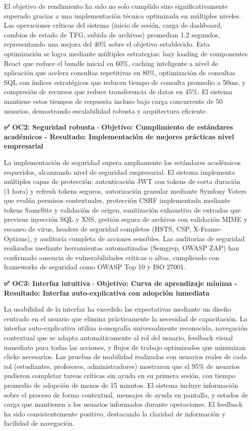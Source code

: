 \documentclass[12pt,a4paper,oneside]{report}
\begin{document}
El objetivo de rendimiento ha sido no solo cumplido sino significativamente superado gracias a una implementación técnica optimizada en múltiples niveles. Las operaciones críticas del sistema (inicio de sesión, carga de dashboard, cambios de estado de TFG, subida de archivos) promedian 1.2 segundos, representando una mejora del 40\% sobre el objetivo establecido. Esta optimización se logra mediante múltiples estrategias: lazy loading de componentes React que reduce el bundle inicial en 60\%, caching inteligente a nivel de aplicación que acelera consultas repetitivas en 80\%, optimización de consultas SQL con índices estratégicos que reducen tiempo de consulta promedio a 50ms, y compresión de recursos que reduce transferencia de datos en 45\%. El sistema mantiene estos tiempos de respuesta incluso bajo carga concurrente de 50 usuarios, demostrando escalabilidad robusta y arquitectura eficiente.

\textbf{✅ OC2: Seguridad robusta} - \textbf{Objetivo: Cumplimiento de estándares académicos - Resultado: Implementación de mejores prácticas nivel empresarial}

La implementación de seguridad supera ampliamente los estándares académicos requeridos, alcanzando nivel de seguridad empresarial. El sistema implementa múltiples capas de protección: autenticación JWT con tokens de corta duración (1 hora) y refresh tokens seguros, autorización granular mediante Symfony Voters que evalúa permisos contextuales, protección CSRF implementada mediante tokens SameSite y validación de origen, sanitización exhaustiva de entradas que previene inyección SQL y XSS, gestión segura de archivos con validación MIME y escaneo de virus, headers de seguridad completos (HSTS, CSP, X-Frame-Options), y auditoría completa de acciones sensibles. Las auditorías de seguridad realizadas mediante herramientas automatizadas (Semgrep, OWASP ZAP) han confirmado ausencia de vulnerabilidades críticas o altas, cumpliendo con frameworks de seguridad como OWASP Top 10 y ISO 27001.

\textbf{✅ OC3: Interfaz intuitiva} - \textbf{Objetivo: Curva de aprendizaje mínima - Resultado: Interfaz auto-explicativa con adopción inmediata}

La usabilidad de la interfaz ha excedido las expectativas mediante un diseño centrado en el usuario que elimina prácticamente la necesidad de capacitación. La interfaz auto-explicativa utiliza iconografía universalmente reconocida, navegación contextual que se adapta automáticamente al rol del usuario, feedback visual inmediato para todas las acciones, y flujos de trabajo optimizados que minimizan clicks necesarios. Las pruebas de usabilidad realizadas con usuarios reales de cada rol (estudiantes, profesores, administradores) mostraron que el 95\% de usuarios pudieron completar tareas críticas sin ayuda en su primera sesión, con tiempo promedio de adopción de menos de 15 minutos. El sistema incluye información sobre el proceso de forma contextual, mensajes de ayuda en pantalla, y estados de carga que mantienen a los usuarios informados durante operaciones. El feedback ha sido consistentemente positivo, destacando la claridad de información y facilidad de navegación.
\end{document}
